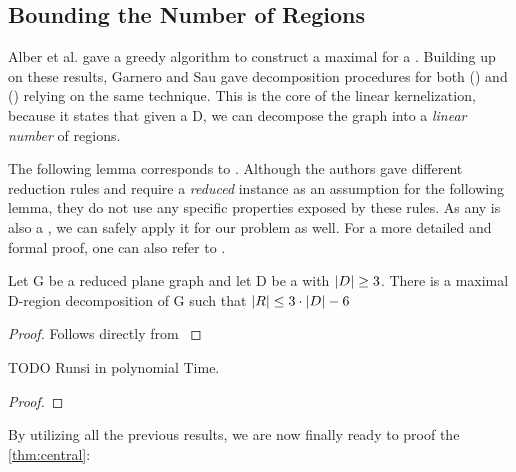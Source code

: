 

\subsection{Bounding the Number of Regions}

Alber et al. \cite[Proposition 1]{Alber2004} gave a greedy algorithm to construct a maximal \dreg for a \dom. Building up on these results, Garnero and Sau gave decomposition procedures for both \rbdom (\cite{Garnero2017a}) and \tdom (\cite{Garnero2018}) relying on the same technique. This is the core of the linear kernelization, because it states that given a \dom D, we can decompose the graph into a \textit{linear number} of regions.


The following lemma corresponds to \cite[Proposition 1 and Lemma 5]{Alber2004}. Although the authors gave different reduction rules and require a \textit{reduced} instance as an assumption for the following lemma, they do not use any specific properties exposed by these rules. 
As any \sdom is also a \dom, we can safely apply it for our problem as well. For a more detailed and formal proof, one can also refer to \cite[Proposition 1]{Garnero2018}.

\begin{lemma}\label{lemma:numRegions}
    Let G be a reduced plane graph and let D be a \sdom with $\abs{D}\geq 3$. There is a maximal D-region decomposition of G such that $\abs{R} \leq 3 \cdot \abs{D} - 6$
\end{lemma}
\begin{proof} 
    Follows directly from \cite[Proposition 1 and Lemma 5]{Alber2004}
\end{proof}


\begin{lemma}\label{lemma:runtime}
    TODO Runsi in polynomial Time. 
\end{lemma}
\begin{proof} 
\end{proof}

\noindent By utilizing all the previous results, we are now finally ready to proof the \cref{thm:central}: 

